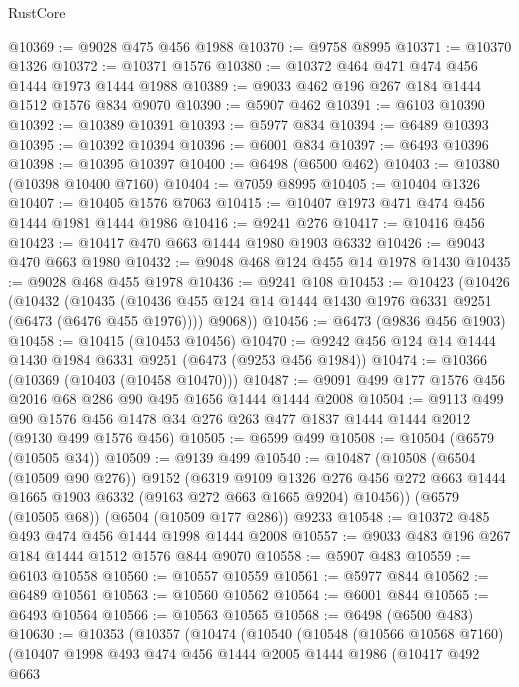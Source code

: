 \begin{lexlean}{RustCore}
\begin{coremodule}
@10369 := @9028 @475 @456 @1988
@10370 := @9758 @8995
@10371 := @10370 @1326
@10372 := @10371 @1576
@10380 := @10372 @464 @471 @474 @456 @1444 @1973 @1444 @1988
@10389 := @9033 @462 @196 @267 @184 @1444 @1512 @1576 @834 @9070
@10390 := @5907 @462
@10391 := @6103 @10390
@10392 := @10389 @10391
@10393 := @5977 @834
@10394 := @6489 @10393
@10395 := @10392 @10394
@10396 := @6001 @834
@10397 := @6493 @10396
@10398 := @10395 @10397
@10400 := @6498 (@6500 @462)
@10403 := @10380 (@10398 @10400 @7160)
@10404 := @7059 @8995
@10405 := @10404 @1326
@10407 := @10405 @1576 @7063
@10415 := @10407 @1973 @471 @474 @456 @1444 @1981 @1444 @1986
@10416 := @9241 @276
@10417 := @10416 @456
@10423 := @10417 @470 @663 @1444 @1980 @1903 @6332
@10426 := @9043 @470 @663 @1980
@10432 := @9048 @468 @124 @455 @14 @1978 @1430
@10435 := @9028 @468 @455 @1978
@10436 := @9241 @108
@10453 := @10423
    (@10426
      (@10432
        (@10435 (@10436 @455 @124 @14 @1444 @1430 @1976 @6331 @9251 (@6473 (@6476 @455 @1976))))
        @9068))
@10456 := @6473 (@9836 @456 @1903)
@10458 := @10415 (@10453 @10456)
@10470 := @9242 @456 @124 @14 @1444 @1430 @1984 @6331 @9251 (@6473 (@9253 @456 @1984))
@10474 := @10366 (@10369 (@10403 (@10458 @10470)))
@10487 := @9091 @499 @177 @1576 @456 @2016 @68 @286 @90 @495 @1656 @1444 @1444 @2008
@10504 := @9113
    @499
    @90
    @1576
    @456
    @1478
    @34
    @276
    @263
    @477
    @1837
    @1444
    @1444
    @2012
    (@9130 @499 @1576 @456)
@10505 := @6599 @499
@10508 := @10504 (@6579 (@10505 @34))
@10509 := @9139 @499
@10540 := @10487
    (@10508
      (@6504 (@10509 @90 @276))
      @9152
      (@6319
        @9109
        @1326
        @276
        @456
        @272
        @663
        @1444
        @1665
        @1903
        @6332
        (@9163 @272 @663 @1665 @9204)
        @10456))
    (@6579 (@10505 @68))
    (@6504 (@10509 @177 @286))
    @9233
@10548 := @10372 @485 @493 @474 @456 @1444 @1998 @1444 @2008
@10557 := @9033 @483 @196 @267 @184 @1444 @1512 @1576 @844 @9070
@10558 := @5907 @483
@10559 := @6103 @10558
@10560 := @10557 @10559
@10561 := @5977 @844
@10562 := @6489 @10561
@10563 := @10560 @10562
@10564 := @6001 @844
@10565 := @6493 @10564
@10566 := @10563 @10565
@10568 := @6498 (@6500 @483)
@10630 := @10353
    (@10357
      (@10474
        (@10540
          (@10548
            (@10566 @10568 @7160)
            (@10407
              @1998
              @493
              @474
              @456
              @1444
              @2005
              @1444
              @1986
              (@10417
                @492
                @663

\end{coremodule}
\end{lexlean}
